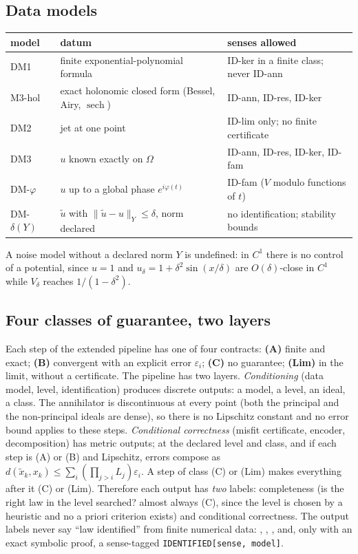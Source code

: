 \subsection{Data models}
\begin{center}\small
\begin{tabular}{@{}lp{5.4cm}p{4.4cm}@{}}
\toprule
model & datum & senses allowed\\
\midrule
DM1 & finite exponential-polynomial formula & ID-ker in a finite class; never ID-ann\\
M3-hol & exact holonomic closed form (Bessel, Airy, $\operatorname{sech}$) & ID-ann, ID-res, ID-ker\\
DM2 & jet at one point & ID-lim only; no finite certificate\\
DM3 & $u$ known exactly on $\Omega$ & ID-ann, ID-res, ID-ker, ID-fam\\
DM-$\varphi$ & $u$ up to a global phase $e^{i\varphi(t)}$ & ID-fam ($V$ modulo functions of $t$)\\
DM-$\delta(Y)$ & $\tilde u$ with $\lVert\tilde u-u\rVert_Y\le\delta$, norm declared & no identification; stability bounds\\
\bottomrule
\end{tabular}
\end{center}
A noise model without a declared norm $Y$ is undefined: in $C^1$ there is no control of a potential, since $u=1$ and
$u_\delta=1+\delta^2\sin(x/\delta)$ are $O(\delta)$-close in $C^1$ while $V_\delta$ reaches $1/(1-\delta^2)$.

\subsection{Four classes of guarantee, two layers}
Each step of the extended pipeline has one of four contracts: \textbf{(A)} finite and exact; \textbf{(B)} convergent with an explicit
error $\varepsilon_i$; \textbf{(C)} no guarantee; \textbf{(Lim)} in the limit, without a certificate. The pipeline has two layers.
\emph{Conditioning} (data model, level, identification) produces discrete outputs: a model, a level, an ideal, a class. The annihilator is
discontinuous at every point (both the principal and the non-principal ideals are dense), so there is no Lipschitz constant and no error bound applies to these steps.
\emph{Conditional correctness} (misfit certificate, encoder, decomposition) has metric outputs; at the declared level and class, and if each step is (A) or (B) and Lipschitz,
errors compose as $d(\tilde x_k,x_k)\le\sum_i(\prod_{j>i}L_j)\varepsilon_i$. A step of class (C) or (Lim) makes everything after it (C) or (Lim).
Therefore each output has \emph{two} labels: completeness (is the right law in the level searched? almost always (C), since the level is chosen by a heuristic and no a priori criterion
exists) and conditional correctness. The output labels never say ``law identified'' from finite numerical data: \FC, \MIS, \UND, \IDK{} and, only with an exact symbolic proof, a sense-tagged \texttt{IDENTIFIED[sense, model]}.

